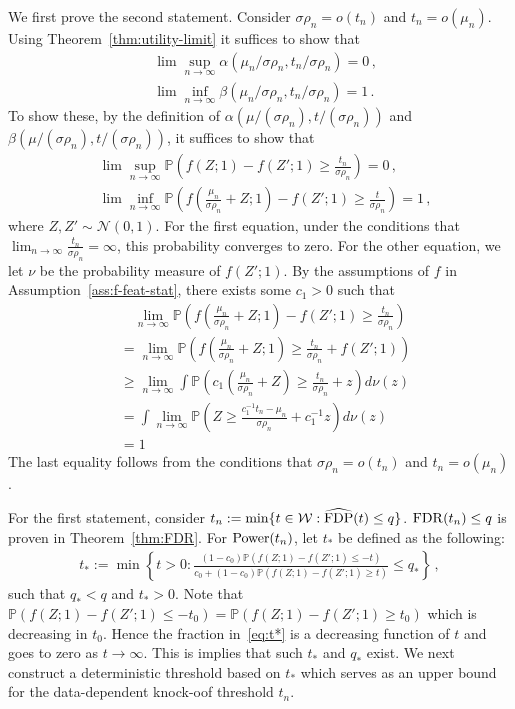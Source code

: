 \documentclass[11pt]{article}
\newcommand{\FDP}{{\rm FDP}}
\newcommand{\FDR}{{\rm FDR}}
\newcommand{\Power}{{\rm Power}}
\newcommand{\Prob}{\mathbb{P}}
\begin{document}
We first prove the second statement. Consider $\sigma\rho_n=o(t_n)$ and $t_n = o(\mu_n)$. Using Theorem~\ref{thm:utility-limit} it suffices to show that 
\begin{align*}
&\lim\sup_{n\to\infty}\alpha(\mu_n/\sigma\rho_n,t_n/\sigma\rho_n) = 0\,,\\
&\lim\inf_{n\to\infty} \beta(\mu_n/\sigma\rho_n,t_n/\sigma\rho_n)=1\,.
\end{align*}
To show these, by the definition of $\alpha(\mu/(\sigma\rho_n),t/(\sigma\rho_n))$ and $\beta(\mu/(\sigma\rho_n),t/(\sigma\rho_n))$, it suffices to show that
\begin{align*}
&\lim\sup_{n\to\infty}\Prob\left(f(Z;1)-f(Z';1)\geq \frac{t_n}{\sigma\rho_n}\right) = 0\,,\\
&\lim\inf_{n\to\infty} \Prob\left(f\left(\frac{\mu_n}{\sigma\rho_n}+Z;1\right)-f\left(Z';1\right)\geq \frac{t}{\sigma\rho_n}\right)=1\,,
\end{align*}
where $Z,Z'\sim\mathcal{N}(0,1)$. For the first equation, under the conditions that $\lim_{n\to\infty}\frac{t_n}{\sigma\rho_n}= \infty$, this probability converges to zero. 
For the other equation, we let $\nu$ be the probability measure of $f(Z';1)$. By the assumptions of $f$ in Assumption~\ref{ass:f-feat-stat}, there exists some $c_1>0$ such that
\begin{align*}
&\quad\lim_{n\to\infty}\Prob\left(f\left(\frac{\mu_n}{\sigma\rho_n}+Z;1\right)-f\left(Z';1\right)\geq \frac{t_n}{\sigma\rho_n}\right)\\
&= \lim_{n\to\infty}\Prob\left(f\left(\frac{\mu_n}{\sigma\rho_n}+Z;1\right)\ge \frac{t_n}{\sigma\rho_n}+f\left(Z';1\right)\right)\\
&\ge \lim_{n\to\infty}\int\Prob\left(c_1\left(\frac{\mu_n}{\sigma\rho_n}+Z\right)\ge\frac{t_n}{\sigma\rho_n}+z\right)d\nu(z)\\
&= \int\lim_{n\to\infty}\Prob\left(Z\ge \frac{c_1^{-1}t_n-\mu_n}{\sigma\rho_n}+c_1^{-1}z\right)d\nu(z)\\
&= 1
\end{align*}
The last equality follows from the conditions that $\sigma\rho_n=o(t_n)$ and $t_n=o(\mu_n)$.

For the first statement, consider $t_n:=\min\{t\in\mathcal{W}:\widehat{\FDP}(t)\le q\}$. $\FDR(t_n)\le q$ is proven in Theorem~\ref{thm:FDR}. For $\Power(t_n)$, let $t_*$ be defined as the following:
\begin{align}\label{eq:t*}
t_*:=\min\left\{t>0:\frac{(1-c_0)\Prob(f(Z;1)-f(Z';1)\le -t)}{c_0+(1-c_0)\Prob(f(Z;1)-f(Z';1)\ge t)}\le q_*\right\}\,,
\end{align}
such that $q_*<q$ and $t_*>0$. Note that $\Prob(f(Z;1)-f(Z';1)\le -t_0) = \Prob(f(Z;1)-f(Z';1)\ge t_0)$ which is decreasing in $t_0$. Hence the fraction in~\eqref{eq:t*} is a decreasing function of $t$ and goes to zero as $t\to\infty$. This is implies that such $t_*$ and $q_*$ exist. We next construct a deterministic threshold based on $t_*$ which serves as an upper bound for the data-dependent knock-oof threshold $t_n$.
\end{document}
